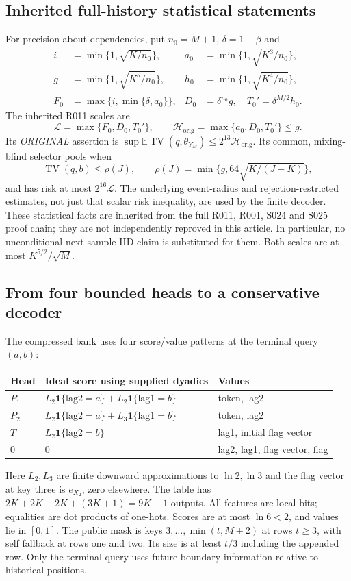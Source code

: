\documentclass[11pt,letterpaper]{article}
\theoremstyle{definition}\newtheorem{definition}[theorem]{Definition}
\theoremstyle{remark}\newtheorem{remark}[theorem]{Remark}
\newcommand{\TV}{\operatorname{TV}}
\newcommand{\E}{\mathbb{E}}
\newcommand{\ind}{\mathbf{1}}
\newcommand{\unit}[1]{\textsf{#1}}
\begin{document}
\subsection{Inherited full-history statistical statements}
For precision about dependencies, put $n_0=M+1$, $\delta=1-\beta$ and
\begin{align*}
 i&=\min\{1,\sqrt{K/n_0}\},& a_0&=\min\{1,\sqrt{K^3/n_0}\},\\
 g&=\min\{1,\sqrt{K^5/n_0}\},& h_0&=\min\{1,\sqrt{K^4/n_0}\},\\
 F_0&=\max\{i,\min\{\delta,a_0\}\},&
 D_0&=\delta^{n_0}g,\quad T_0'=\delta^{M/2}h_0.
\end{align*}
The inherited \unit{R011} scales are
\begin{equation}\label{eq:inherited}
 \mathcal L=\max\{F_0,D_0,T_0'\},\qquad
 \mathcal H_{\mathrm{orig}}=\max\{a_0,D_0,T_0'\}\le g.
\end{equation}
Its \emph{ORIGINAL} assertion is $\sup\E\TV(q,\theta_{Y_M})\le2^{13}\mathcal H_{\mathrm{orig}}$. Its common, mixing-blind selector pools when
\[
 \TV(q,b)\le\rho(J),\qquad \rho(J)=\min\{g,64\sqrt{K/(J+K)}\},
\]
and has risk at most $2^{16}\mathcal L$. The underlying event-radius and rejection-restricted estimates, not just that scalar risk inequality, are used by the finite decoder. These statistical facts are inherited from the full \unit{R011}, \unit{R001}, \unit{S024} and \unit{S025} proof chain; they are not independently reproved in this article. In particular, no unconditional next-sample IID claim is substituted for them. Both scales are at most $K^{5/2}/\sqrt M$.

\subsection{From four bounded heads to a conservative decoder}
The compressed bank uses four score/value patterns at the terminal query $(a,b)$:
\begin{center}\small
\begin{tabular}{@{}lll@{}}\toprule
Head & Ideal score using supplied dyadics & Values\\\midrule
$P_1$ & $L_2\ind\{\mathrm{lag2}=a\}+L_2\ind\{\mathrm{lag1}=b\}$ & token, lag2\\
$P_2$ & $L_2\ind\{\mathrm{lag2}=a\}+L_3\ind\{\mathrm{lag1}=b\}$ & token, lag2\\
$T$ & $L_2\ind\{\mathrm{lag2}=b\}$ & lag1, initial flag vector\\
$0$ & $0$ & lag2, lag1, flag vector, flag\\\bottomrule
\end{tabular}
\end{center}
Here $L_2,L_3$ are finite downward approximations to $\ln2,\ln3$ and the flag vector at key three is $e_{X_2}$, zero elsewhere. The table has $2K+2K+2K+(3K+1)=9K+1$ outputs. All features are local bits; equalities are dot products of one-hots. Scores are at most $\ln6<2$, and values lie in $[0,1]$. The public mask is keys $3,\ldots,\min(t,M+2)$ at rows $t\ge3$, with self fallback at rows one and two. Its size is at least $t/3$ including the appended row. Only the terminal query uses future boundary information relative to historical positions.
\end{document}
